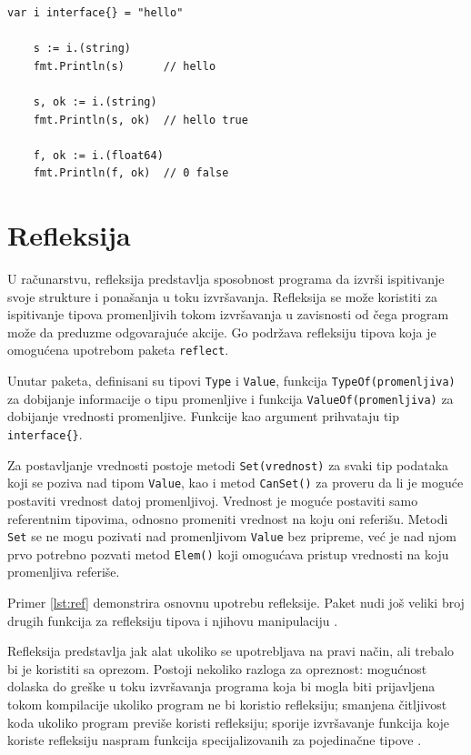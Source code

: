 \documentclass[12pt,oneside]{memoir}
\begin{document}
\begin{center}
\begin{lstlisting}[caption=Pretpostavljanje tipova kod interfejsa, label={lst:type},  backgroundcolor=\color{background}]
	var i interface{} = "hello"

	s := i.(string)
	fmt.Println(s) 		// hello

	s, ok := i.(string)
	fmt.Println(s, ok) 	// hello true

	f, ok := i.(float64)
	fmt.Println(f, ok) 	// 0 false
\end{lstlisting}
\end{center}


\section{Refleksija}

U računarstvu, refleksija predstavlja sposobnost programa da izvrši ispitivanje svoje strukture i ponašanja u toku izvršavanja. Refleksija se može koristiti za ispitivanje tipova promenljivih tokom izvršavanja u zavisnosti od čega program može da preduzme odgovarajuće akcije. Go podržava refleksiju tipova koja je omogućena upotrebom paketa \texttt{reflect}.

Unutar paketa, definisani su tipovi \texttt{Type} i \texttt{Value}, funkcija \texttt{TypeOf(promenljiva)} za dobijanje informacije o tipu promenljive i funkcija \texttt{ValueOf(promenljiva)} za dobijanje vrednosti promenljive. Funkcije kao argument prihvataju tip \texttt{interface\{\}}. 

Za postavljanje vrednosti postoje metodi \texttt{Set(vrednost)} za svaki tip podataka koji se poziva nad tipom \texttt{Value}, kao i metod \texttt{CanSet()} za proveru da li je moguće postaviti vrednost datoj promenljivoj. Vrednost je moguće postaviti samo referentnim tipovima, odnosno promeniti vrednost na koju oni referišu. Metodi \texttt{Set} se ne mogu pozivati nad promenljivom \texttt{Value} bez pripreme, već je nad njom prvo potrebno pozvati metod \texttt{Elem()} koji omogućava pristup vrednosti na koju promenljiva referiše.  

Primer \ref{lst:ref} demonstrira osnovnu upotrebu refleksije. Paket nudi još veliki broj drugih funkcija za refleksiju tipova i njihovu manipulaciju \cite{reflect}.

Refleksija predstavlja jak alat ukoliko se upotrebljava na pravi način, ali trebalo bi je koristiti sa oprezom. Postoji nekoliko razloga za opreznost: mogućnost dolaska do greške u toku izvršavanja programa koja bi mogla biti prijavljena tokom kompilacije ukoliko program ne bi koristio refleksiju; smanjena čitljivost koda ukoliko program previše koristi refleksiju; sporije izvršavanje funkcija koje koriste refleksiju naspram funkcija specijalizovanih za pojedinačne tipove \cite{bookGoProg}.
\end{document}
